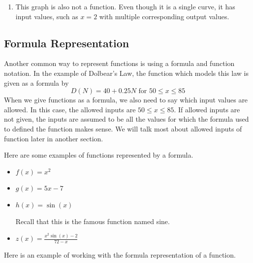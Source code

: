 \documentclass{ximera}
\begin{document}
\begin{example}
\begin{explanation}
\begin{enumerate}[label=\alph*.]
\item 
This graph is also not a function.  Even though it is a single curve, it has input values, such as $x=2$ with multiple corresponding output values.

\begin{image}
\end{image}

 \end{enumerate}
\end{explanation}
\end{example}
 
 \subsection{Formula Representation}
 Another common way to represent functions is using a formula and function notation.  In the example of Dolbear's Law, the function which models this law is given as a formula by 
 $$D(N)=40+0.25N \text{ for } 50 \leq x \leq 85$$
 When we give functions as a formula, we also need to say which input values are allowed.  In this case, the allowed inputs are $50 \leq x \leq 85$.  If allowed inputs are not given, the inputs are assumed to be all the values for which the formula used to defined the function makes sense.  We will talk most about allowed inputs of function later in another section.
 
 Here are some examples of functions represented by a formula.
 
\begin{itemize}
\item $f(x)=x^2$
\item $g(x)=5x-7$
\item $h(x)=\sin(x)$  

Recall that this is the famous function named sine.
\item $z(x)=\frac{x^2\sin(x)-2}{72-x}$
\end{itemize}

Here is an example of working with the formula representation of a function.
\end{document}
